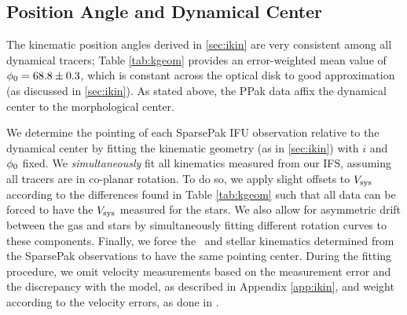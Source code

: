 \documentclass[apj,iop,numberedappendix]{emulateapj}
\begin{document}
\subsection{Position Angle and Dynamical Center}
\label{sec:pointing}

The kinematic position angles derived in \sect \ref{sec:ikin} are very
consistent among all dynamical tracers; Table \ref{tab:kgeom} provides an
error-weighted mean value of $\phi_0 = 68.8\pm0.3$, which is constant across the
optical disk to good approximation (as discussed in \sect \ref{sec:ikin}).  As
stated above, the PPak data affix the dynamical center to the morphological
center.

We determine the pointing of each SparsePak IFU observation relative to the
dynamical center by fitting the kinematic geometry (as in \sect \ref{sec:ikin})
with $i$ and $\phi_0$ fixed.  We {\it simultaneously} fit all kinematics measured
from our IFS, assuming all tracers are in co-planar rotation.  To do so, we
apply slight offsets to $V_{\rm sys}$ according to the differences found in Table
\ref{tab:kgeom} such that all data can be forced to have the $V_{\rm sys}$ measured
for the stars.  We also allow for asymmetric drift between the gas and stars by
simultaneously fitting different rotation curves to these components.  Finally,
we force the \oiii\ and stellar kinematics determined from the SparsePak
observations to have the same pointing center.  During the fitting procedure, we
omit velocity measurements based on the measurement error and the discrepancy
with the model, as described in Appendix \ref{app:ikin}, and weight according to
the velocity errors, as done in \citet{2003ApJ...599L..79A}.
\end{document}
